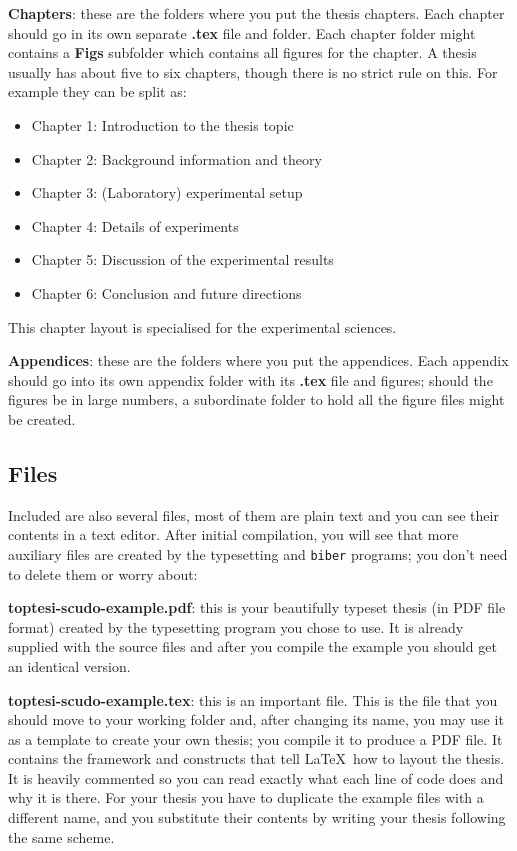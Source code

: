 \textbf{Chapters}: these are the folders where you put the thesis chapters.  Each chapter should go in its own separate \textbf{.tex} file and folder. Each chapter folder might contains a \textbf{Figs} subfolder which contains all figures for the chapter. A thesis usually has about five to six chapters, though there is no strict rule on this. For example they can be split as:
\begin{itemize}
	\item Chapter 1: Introduction to the thesis topic
	\item Chapter 2: Background information and theory
	\item Chapter 3: (Laboratory) experimental setup
	\item Chapter 4: Details of experiments
	\item Chapter 5: Discussion of the experimental results
	\item Chapter 6: Conclusion and future directions
\end{itemize}
This chapter layout is specialised for the experimental sciences.

\textbf{Appendices}: these are the folders where you put the appendices. Each appendix should go into its own appendix folder with its \textbf{.tex} file and figures; should the figures be in large numbers, a subordinate folder to hold all the figure files might be created.

\subsection{Files}

Included are also several files, most of them are plain text and you can see their contents in a text editor. After initial compilation, you will see that more auxiliary files are created by the typesetting and \texttt{biber} programs; you don't need to delete them or worry about:

\noindent\textbf{toptesi-scudo-example.pdf}: this is your beautifully typeset thesis (in PDF file format) created by the typesetting program you chose to use. It is already supplied with the source files and after you compile the example you should get an identical version.

\noindent\textbf{toptesi-scudo-example.tex}: this is an important file. This is the file that you should move to your working folder and, after changing its name, you may use it as a template to create your own thesis; you compile it to produce a PDF file. It contains the framework and constructs that tell \LaTeX\ how to layout the thesis. It is heavily commented so you can read exactly what each line of code does and why it is there. 
 For your thesis you have to duplicate the example files with a different name, and you substitute their contents by writing your thesis following the same scheme.

